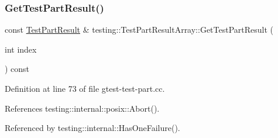 \subsubsection{\texorpdfstring{Get\+Test\+Part\+Result()}{GetTestPartResult()}}
{\footnotesize\ttfamily const \hyperlink{classtesting_1_1TestPartResult}{Test\+Part\+Result} \& testing\+::\+Test\+Part\+Result\+Array\+::\+Get\+Test\+Part\+Result (\begin{DoxyParamCaption}\item[{int}]{index }\end{DoxyParamCaption}) const}



Definition at line 73 of file gtest-\/test-\/part.\+cc.



References testing\+::internal\+::posix\+::\+Abort().



Referenced by testing\+::internal\+::\+Has\+One\+Failure().


